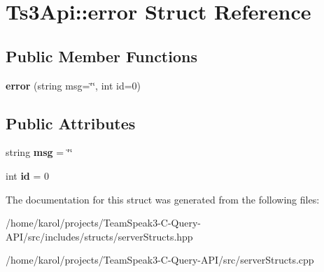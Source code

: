 \hypertarget{struct_ts3_api_1_1error}{}\section{Ts3\+Api\+:\+:error Struct Reference}
\label{struct_ts3_api_1_1error}
\subsection*{Public Member Functions}
\begin{DoxyCompactItemize}
\item 
{\bfseries error} (string msg=\char`\"{}\char`\"{}, int id=0)\hypertarget{struct_ts3_api_1_1error_a03255b3eab76cd950fdfb4ec843cbec6}{}\label{struct_ts3_api_1_1error_a03255b3eab76cd950fdfb4ec843cbec6}

\end{DoxyCompactItemize}
\subsection*{Public Attributes}
\begin{DoxyCompactItemize}
\item 
string {\bfseries msg} = \char`\"{}\char`\"{}\hypertarget{struct_ts3_api_1_1error_ac72761d3bd826d444d0d342a27b64f68}{}\label{struct_ts3_api_1_1error_ac72761d3bd826d444d0d342a27b64f68}

\item 
int {\bfseries id} = 0\hypertarget{struct_ts3_api_1_1error_a3c86d7bb5a4db46e71b00c78c482c6b9}{}\label{struct_ts3_api_1_1error_a3c86d7bb5a4db46e71b00c78c482c6b9}

\end{DoxyCompactItemize}


The documentation for this struct was generated from the following files\+:\begin{DoxyCompactItemize}
\item 
/home/karol/projects/\+Team\+Speak3-\/\+C-\/\+Query-\/\+A\+P\+I/src/includes/structs/server\+Structs.\+hpp\item 
/home/karol/projects/\+Team\+Speak3-\/\+C-\/\+Query-\/\+A\+P\+I/src/server\+Structs.\+cpp\end{DoxyCompactItemize}
